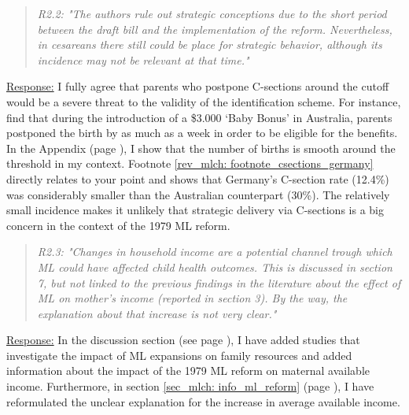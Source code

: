 \bigskip
{}
\begin{quote}
	\textit{R2.2: "The authors rule out strategic conceptions due to the short period between the draft bill and the implementation of the reform. Nevertheless, in cesareans there still could be place for strategic behavior, although its incidence may not be relevant at that time."}
\end{quote}
\underline{Response:} I fully agree that parents who postpone C-sections around the cutoff would be a severe threat to the validity of the identification scheme. For instance, \cite{gans2009born} find that during the introduction of a \$3.000 `Baby Bonus' in Australia, parents postponed the birth by as much as a week in order to be eligible for the benefits. In the Appendix (page \pageref{sec_mlch:empirical_strategy_threats+validity}), I show that the number of births is smooth around the threshold in my context. Footnote \ref{rev_mlch: footnote_csections_germany} directly relates to your point and shows that Germany's C-section rate (12.4\%) was considerably smaller than the Australian counterpart (30\%). The relatively small incidence makes it unlikely that strategic delivery via C-sections is a big concern in the context of the 1979 ML reform.

 


\bigskip
{}
\begin{quote}
	\textit{R2.3: "Changes in household income are a potential channel trough which ML could have affected child health outcomes. This is discussed in section 7, but not linked to the previous findings in the literature about the effect of ML on mother's income (reported in section 3). By the way, the explanation about that increase is not very clear."}
\end{quote}
\underline{Response:}  In the discussion section (see page \pageref{rev_mlch: r2_maternal_income_missing_link}), I have added studies that investigate the impact of ML expansions on family resources and added information about the impact of the 1979 ML reform on maternal available income. Furthermore, in section \ref{sec_mlch: info_ml_reform} (page \pageref{rev_mlch: R2_increase_income}), I have reformulated the unclear explanation for the increase in average available income.


